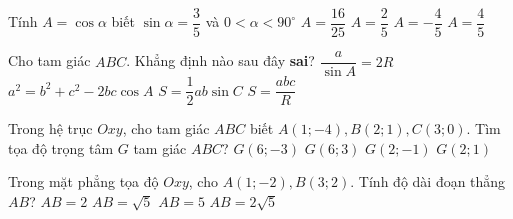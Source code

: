 \begin{ex}%
	Tính $A=\cos \alpha $ biết $\sin \alpha =\dfrac{3}{5}$ và $0<\alpha<90^\circ$
	\choice
	{$A=\dfrac{16}{25}$}
	{$A=\dfrac{2}{5}$}
	{$A=-\dfrac{4}{5}$}
	{\True $A=\dfrac{4}{5}$}
\end{ex}
\begin{ex}%
	Cho tam giác $ABC$. Khẳng định nào sau đây \textbf{sai}?
	\choice
	{$\dfrac{a}{\sin A}=2R$}
	{$a^2=b^2+c^2-2bc\cos A$}
	{$S=\dfrac{1}{2}ab \sin C$}
	{\True $S=\dfrac{abc}{R}$}
\end{ex}

\begin{ex}%
	Trong hệ trục $Oxy$, cho tam giác $ABC$ biết $A(1;-4), B(2;1), C(3;0)$. Tìm tọa độ trọng tâm $G$ tam giác $ABC$?
	\choice
	{$G(6;-3)$}
	{$G(6;3)$}
	{\True $G(2;-1)$}
	{$G(2;1)$}
\end{ex}

\begin{ex}%
	Trong mặt phẳng tọa độ $Oxy$, cho $A(1;-2), B(3;2)$. Tính độ dài đoạn thẳng $AB$?
	\choice
	{$AB=2$}
	{$AB=\sqrt{5}$}
	{$AB=5$}
	{\True $AB=2\sqrt{5}$}
\end{ex}

